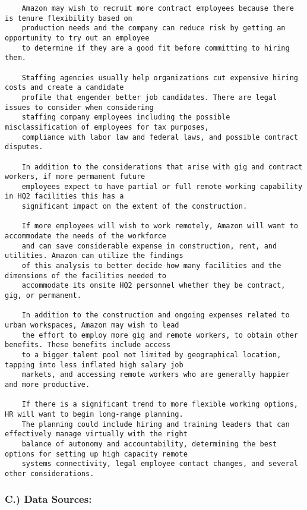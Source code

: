 \documentclass[]{article}
\begin{document}
\begin{verbatim}
    Amazon may wish to recruit more contract employees because there is tenure flexibility based on 
    production needs and the company can reduce risk by getting an opportunity to try out an employee 
    to determine if they are a good fit before committing to hiring them. 

    Staffing agencies usually help organizations cut expensive hiring costs and create a candidate 
    profile that engender better job candidates. There are legal issues to consider when considering 
    staffing company employees including the possible misclassification of employees for tax purposes, 
    compliance with labor law and federal laws, and possible contract disputes. 

    In addition to the considerations that arise with gig and contract workers, if more permanent future 
    employees expect to have partial or full remote working capability in HQ2 facilities this has a 
    significant impact on the extent of the construction. 

    If more employees will wish to work remotely, Amazon will want to accommodate the needs of the workforce 
    and can save considerable expense in construction, rent, and utilities. Amazon can utilize the findings 
    of this analysis to better decide how many facilities and the dimensions of the facilities needed to 
    accommodate its onsite HQ2 personnel whether they be contract, gig, or permanent. 

    In addition to the construction and ongoing expenses related to urban workspaces, Amazon may wish to lead 
    the effort to employ more gig and remote workers, to obtain other benefits. These benefits include access 
    to a bigger talent pool not limited by geographical location, tapping into less inflated high salary job 
    markets, and accessing remote workers who are generally happier and more productive. 

    If there is a significant trend to more flexible working options, HR will want to begin long-range planning. 
    The planning could include hiring and training leaders that can effectively manage virtually with the right 
    balance of autonomy and accountability, determining the best options for setting up high capacity remote 
    systems connectivity, legal employee contact changes, and several other considerations.
\end{verbatim}

\subsubsection{C.) Data Sources:}\label{c.-data-sources}
\end{document}
